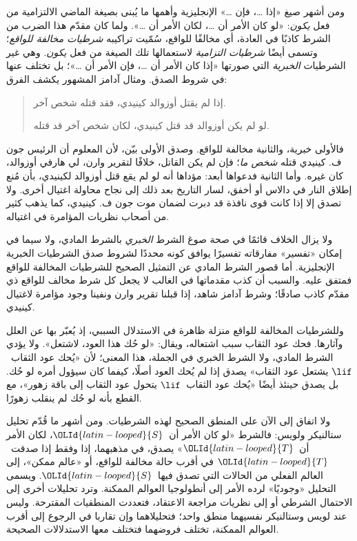 \documentclass[../../../include/open-logic-section]{subfiles}
\begin{document}


ومن أشهر صيغ «إذا \dots، فإن \dots» الإنجليزية وأهمها ما يُبنى بصيغة
الماضي الالتزامية من فعل \emph{يكون}: «لو كان الأمر أن \dots، لكان
الأمر أن \dots». ولما كان مقدّم هذا الضرب من الشرط كاذبًا في العادة،
أي مخالفًا للواقع، سُمّيت تراكيبه \emph{شرطيات مخالفة للواقع}؛ وتسمى
أيضًا \emph{شرطيات التزامية} لاستعمالها تلك الصيغة من فعل \emph{يكون}.
وهي غير الشرطيات \emph{الخبرية} التي صورتها «إذا كان الأمر أن \dots،
فإن الأمر أن \dots»؛ بل تختلف عنها في شروط الصدق. ومثال آدامز المشهور
يكشف الفرق:
\begin{quote}
  إذا لم يقتل أوزوالد كينيدي، فقد قتله شخص آخر.
  
  لو لم يكن أوزوالد قد قتل كينيدي، لكان شخص آخر قد قتله.
\end{quote}
فالأولى خبرية، والثانية مخالفة للواقع. وصدق الأولى بيّن، لأن المعلوم أن
الرئيس جون ف. كينيدي قتله \emph{شخص ما}؛ فإن لم يكن القاتل، خلافًا
لتقرير وارن، لي هارفي أوزوالد، كان غيره. وأما الثانية فدعواها أبعد:
مؤداها أنه لو لم يقع قتل أوزوالد لكينيدي، بأن مُنع إطلاق النار في دالاس
أو أخفق، لسار التاريخ بعد ذلك إلى نجاح محاولة اغتيال أخرى. ولا تصدق
إلا إذا كانت قوى نافذة قد دبرت لضمان موت جون ف. كينيدي، كما يذهب كثير
من أصحاب نظريات المؤامرة في اغتياله.

ولا يزال الخلاف قائمًا في صحة صوغ الشرط \emph{الخبري} بالشرط المادي،
ولا سيما في إمكان «تفسير» مفارقاته تفسيرًا يوافق كونه محددًا لشروط صدق
الشرطيات الخبرية الإنجليزية. أما قصور الشرط المادي عن التمثيل الصحيح
للشرطيات المخالفة للواقع فمتفق عليه. والسبب أن كذب مقدماتها في الغالب
لا يجعل كل شرط مخالف للواقع ذي مقدّم كاذب صادقًا؛ وشرط آدامز شاهد، إذا
قبلنا تقرير وارن ونفينا وجود مؤامرة لاغتيال كينيدي.

وللشرطيات المخالفة للواقع منزلة ظاهرة في الاستدلال السببي، إذ يُعبّر
بها عن العلل وآثارها. فحك عود الثقاب سبب اشتعاله، ويقال: «لو حُك هذا
العود، لاشتعل». ولا يؤدي الشرط المادي، ولا الشرط الخبري في الجملة، هذا
المعنى؛ لأن «يُحك عود الثقاب~$\lif$ يشتعل عود الثقاب» يصدق إذا لم
يُحك العود أصلًا، كيفما كان سيؤول أمره لو حُك. بل يصدق حينئذ أيضًا
«يُحك عود الثقاب~$\lif$ يتحول عود الثقاب إلى باقة زهور»، مع القطع بأنه
لو حُك لم ينقلب زهورًا.

ولا اتفاق إلى الآن على المنطق الصحيح لهذه الشرطيات. ومن أشهر ما قُدّم
تحليل ستالنيكر ولويس: فالشرط «لو كان الأمر أن~${\OLId{latin-looped}{S}}$، لكان الأمر أن~${\OLId{latin-looped}{T}}$»
يصدق، في مذهبهما، إذا وفقط إذا صدقت~${\OLId{latin-looped}{T}}$ في أقرب حالة مخالفة للواقع، أو
«عالم ممكن»، إلى العالم الفعلي من الحالات التي تصدق فيها~${\OLId{latin-looped}{S}}$. ويسمى
التحليل «وجوديًا» لرده الأمر إلى أنطولوجيا العوالم الممكنة. وترد تحليلات
أخرى إلى الاحتمال الشرطي أو إلى نظريات مراجعة الاعتقاد، فتعددت المنطقيات
المقترحة. وليس عند لويس وستالنيكر نفسيهما منطق واحد؛ فتحليلاهما وإن
تقاربا في الرجوع إلى أقرب العوالم الممكنة، تختلف فروضهما فتختلف معها
الاستدلالات الصحيحة.
\end{document}
